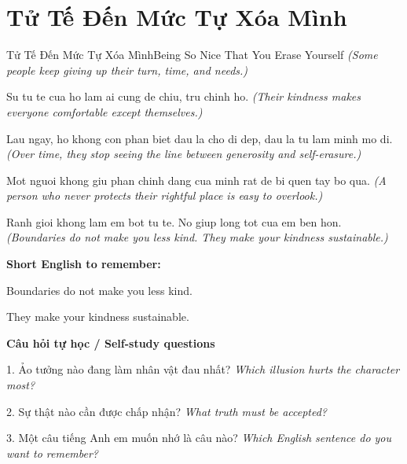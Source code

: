 \section{Tử Tế Đến Mức Tự Xóa Mình}
\begin{truyen}{Tử Tế Đến Mức Tự Xóa Mình}{Being So Nice That You Erase Yourself}
\textit{(Some people keep giving up their turn, time, and needs.)}

Su tu te cua ho lam ai cung de chiu, tru chinh ho.
\textit{(Their kindness makes everyone comfortable except themselves.)}

Lau ngay, ho khong con phan biet dau la cho di dep, dau la tu lam minh mo di.
\textit{(Over time, they stop seeing the line between generosity and self-erasure.)}

Mot nguoi khong giu phan chinh dang cua minh rat de bi quen tay bo qua.
\textit{(A person who never protects their rightful place is easy to overlook.)}

\end{truyen}

\begin{baihoc}
Ranh gioi khong lam em bot tu te. No giup long tot cua em ben hon.
\textit{(Boundaries do not make you less kind. They make your kindness sustainable.)}
\end{baihoc}

\begin{ghinhoanh}
\textbf{Short English to remember:}

Boundaries do not make you less kind.

They make your kindness sustainable.

\end{ghinhoanh}

\begin{tuhocnhanh}
\textbf{Câu hỏi tự học / Self-study questions}

1. Ảo tưởng nào đang làm nhân vật đau nhất? \textit{Which illusion hurts the character most?}

2. Sự thật nào cần được chấp nhận? \textit{What truth must be accepted?}

3. Một câu tiếng Anh em muốn nhớ là câu nào? \textit{Which English sentence do you want to remember?}
\end{tuhocnhanh}
\ngancach

